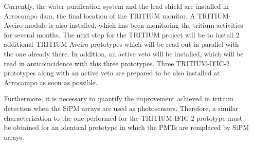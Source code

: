 Currently, the water purification system and the lead shield are installed in Arrocampo dam, the final location of the TRITIUM monitor. A TRITIUM-Aveiro module is also installed, which has been monitoring the tritium activities for several months. The next step for the TRITIUM project will be to install 2 additional TRITIUM-Aveiro prototypes which will be read out in parallel with the one already there. In addition, an active veto will be installed, which will be read in anticoincidence with this three prototypes. Three TRITIUM-IFIC-2 prototypes along with an active veto are prepared to be also installed at Arrocampo as soon as possible.

Furthermore, it is necessary to quantify the improvement achieved in tritium detection when the SiPM arrays are used as photosensors. Therefore, a similar characterization to the one performed for the TRITIUM-IFIC-2 prototype must be obtained for an identical prototype in which the PMTs are remplaced by SiPM arrays.

